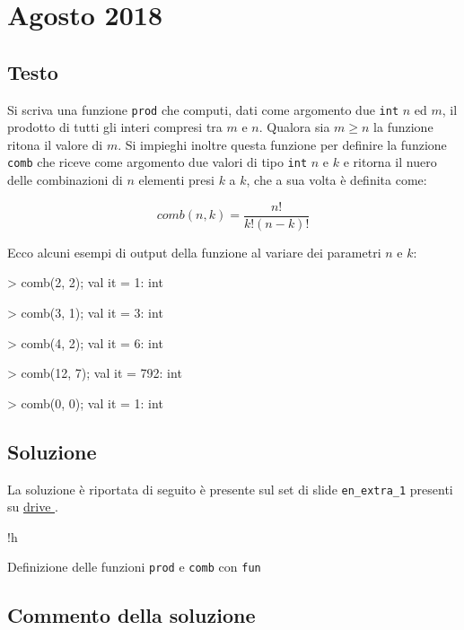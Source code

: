 \section{Agosto 2018}

\subsection*{Testo}

Si scriva una funzione \texttt{prod} che computi, dati come argomento due \texttt{int} \(n\) ed \(m\), il prodotto di tutti gli interi compresi tra \(m\) e \(n\). %
Qualora sia \(m \geqslant n\) la funzione ritona il valore di \(m\). %
Si impieghi inoltre questa funzione per definire la funzione \texttt{comb} che riceve come argomento due valori di tipo \texttt{int} \(n\) e \(k\) e ritorna il nuero delle combinazioni di \(n\) elementi presi \(k\) a \(k\), che a sua volta è definita come:

\begin{equation*}
comb(n, k) = \frac{n!}{k! (n - k)!}
\end{equation*}

Ecco alcuni esempi di output della funzione al variare dei parametri \(n\) e \(k\):

\begin{smlcode}
> comb(2, 2);
val it = 1: int

> comb(3, 1);
val it = 3: int

> comb(4, 2);
val it = 6: int

> comb(12, 7);
val it = 792: int

> comb(0, 0);
val it = 1: int
\end{smlcode}

\subsection*{Soluzione}

La soluzione è riportata di seguito è presente sul set di slide \texttt{en_extra_1} presenti su %
\href{https://drive.google.com/drive/u/1/folders/1mRM8Vjdcvwe5yU9ZYCYf0p2Fylxr5qBL}{drive \ExternalLink}.

\begin{listing}{!h}
\caption{Definizione delle funzioni \texttt{prod} e \texttt{comb} con \texttt{fun}}
\end{listing}

\subsection{Commento della soluzione}

